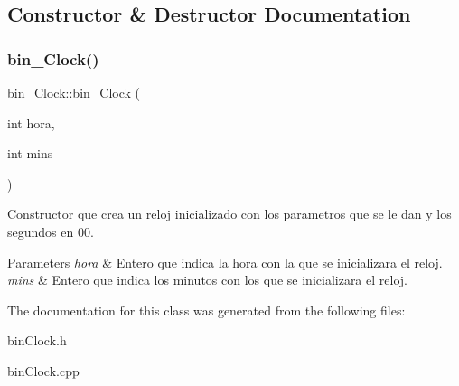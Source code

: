 \subsection{Constructor \& Destructor Documentation}
\mbox{\label{classbin__Clock_a08180ca924ba3cf39b87fad8faafc5cc}} 
\subsubsection{\texorpdfstring{bin\+\_\+\+Clock()}{bin\_Clock()}}
{\footnotesize\ttfamily bin\+\_\+\+Clock\+::bin\+\_\+\+Clock (\begin{DoxyParamCaption}\item[{int}]{hora,  }\item[{int}]{mins }\end{DoxyParamCaption})}



Constructor que crea un reloj inicializado con los parametros que se le dan y los segundos en 00. 


\begin{DoxyParams}{Parameters}
{\em hora} & Entero que indica la hora con la que se inicializara el reloj. \\
\hline
{\em mins} & Entero que indica los minutos con los que se inicializara el reloj. \\
\hline
\end{DoxyParams}


The documentation for this class was generated from the following files\+:\begin{DoxyCompactItemize}
\item 
bin\+Clock.\+h\item 
bin\+Clock.\+cpp\end{DoxyCompactItemize}
